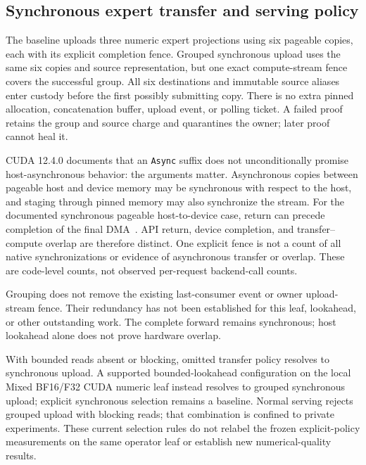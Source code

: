 \subsection{Synchronous expert transfer and serving policy}
The baseline uploads three numeric expert projections using six pageable
copies, each with its explicit completion fence. Grouped synchronous upload
uses the same six copies and source representation, but one exact
compute-stream fence covers the successful group. All six destinations and
immutable source aliases enter custody before the first possibly submitting
copy. There is no extra pinned allocation, concatenation buffer, upload
event, or polling ticket. A failed proof retains the group and source charge
and quarantines the owner; later proof cannot heal it.

CUDA 12.4.0 documents that an \texttt{Async} suffix does not unconditionally
promise host-asynchronous behavior: the arguments matter. Asynchronous copies
between pageable host and device memory may be synchronous with respect to
the host, and staging through pinned memory may also synchronize the stream.
For the documented synchronous pageable host-to-device case, return can
precede completion of the final DMA~\cite{nvidia2024cudasync}. API return,
device completion, and transfer--compute overlap are therefore distinct.
One explicit fence is not a count of all native synchronizations or evidence
of asynchronous transfer or overlap. These are code-level counts, not observed
per-request backend-call counts.

Grouping does not remove the existing last-consumer event or owner
upload-stream fence. Their redundancy has not been established for this leaf,
lookahead, or other outstanding work. The complete forward remains
synchronous; host lookahead alone does not prove hardware overlap.

With bounded reads absent or blocking, omitted transfer policy resolves to
synchronous upload. A supported bounded-lookahead configuration on the local
Mixed BF16/F32 CUDA numeric leaf instead resolves to grouped synchronous
upload; explicit synchronous selection remains a baseline. Normal serving
rejects grouped upload with blocking reads; that combination is confined to
private experiments. These current selection rules do not relabel the frozen
explicit-policy measurements on the same operator leaf or establish new
numerical-quality results.

